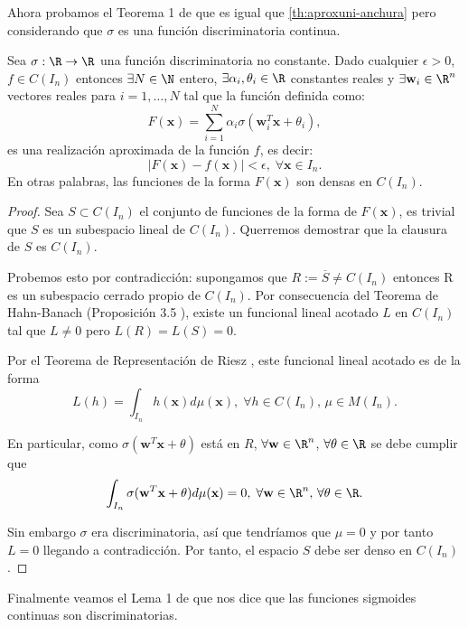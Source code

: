 Ahora probamos el Teorema 1 de \cite{cybenko1989approximation} que es igual que \autoref{th:aproxuni-anchura} pero considerando que $\sigma$ es una función discriminatoria continua.

\begin{teorema}
  Sea $\sigma : \R \to \R$ una función discriminatoria no constante. Dado cualquier $\epsilon > 0$, $f \in C(I_n)$ entonces $\exists N \in \N$ entero, $\exists \alpha_i, \theta_i \in \R$ constantes reales y $\exists \textbf{w}_i \in \R^n$ vectores reales para $i = 1, \ldots, N$ tal que la función definida como:
  $$F(\textbf{x}) = \sum \limits^N_{i = 1} \alpha_i \sigma \left(\textbf{w}^T_i \textbf{x} + \theta_i \right),$$
  es una realización aproximada de la función $f$, es decir:
  $$|F(\textbf{x}) - f(\textbf{x})| < \epsilon, \; \forall \textbf{x} \in I_n.$$
  En otras palabras, las funciones de la forma $F(\textbf{x})$ son densas en $C(I_n)$.
  \label{th:uni1}
\end{teorema}

\begin{proof}
  Sea $S \subset C(I_n)$ el conjunto de funciones de la forma de $F(\textbf{x})$, es trivial que $S$ es un subespacio lineal de $C(I_n)$. Querremos demostrar que la clausura de $S$ es $C(I_n)$.

  Probemos esto por contradicción: supongamos que $R := \overline{S} \neq C(I_n)$ entonces R es un subespacio cerrado propio de $C(I_n)$. Por consecuencia del Teorema de Hahn-Banach (Proposición 3.5 \cite{rudin1973functional}), existe un funcional lineal acotado $L$ en $C(I_n)$ tal que $L \neq 0$ pero $L(R) = L(S) = 0$.

  Por el Teorema de Representación de Riesz \cite{rudin2006real}, este funcional lineal acotado es de la forma
  $$L(h) = \int_{I_n} h(\textbf{x}) d\mu(\textbf{x}), \; \forall h \in C(I_n), \, \mu \in M(I_n).$$

  En particular, como $\sigma(\textbf{w}^T \textbf{x} + \theta)$ está en $R$, $\forall \textbf{w} \in \R^n$, $\forall \theta \in \R$ se debe cumplir que
  $$\int_{I_n} \sigma(\textbf{w}^T \textbf{x} + \theta) d\mu(\textbf{x}) = 0, \; \forall \textbf{w} \in \R^n, \, \forall \theta \in \R.$$

  Sin embargo $\sigma$ era discriminatoria, así que tendríamos que $\mu = 0$  y por tanto $L = 0$ llegando a contradicción. Por tanto, el espacio $S$ debe ser denso en $C(I_n)$.
\end{proof}

Finalmente veamos el Lema 1 de \cite{cybenko1989approximation} que nos dice que las funciones sigmoides continuas son discriminatorias.

